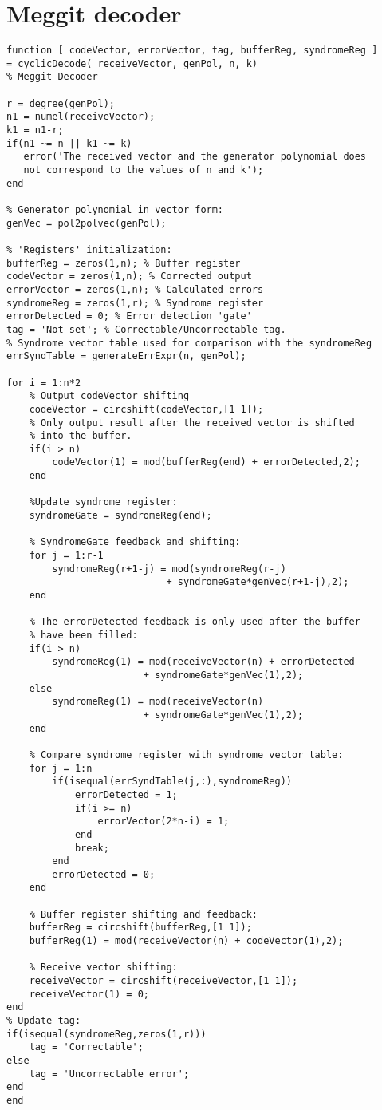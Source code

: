 \documentclass[MiniProjectMain]{subfiles}
\begin{document}
\newpage
\section{Meggit decoder}

\begin{lstlisting}[caption=Cyclic Meggit decoding]
function [ codeVector, errorVector, tag, bufferReg, syndromeReg ] 
= cyclicDecode( receiveVector, genPol, n, k)
% Meggit Decoder

r = degree(genPol);
n1 = numel(receiveVector);
k1 = n1-r;
if(n1 ~= n || k1 ~= k)
   error('The received vector and the generator polynomial does 
   not correspond to the values of n and k'); 
end

% Generator polynomial in vector form:
genVec = pol2polvec(genPol);

% 'Registers' initialization:
bufferReg = zeros(1,n); % Buffer register
codeVector = zeros(1,n); % Corrected output
errorVector = zeros(1,n); % Calculated errors
syndromeReg = zeros(1,r); % Syndrome register
errorDetected = 0; % Error detection 'gate'
tag = 'Not set'; % Correctable/Uncorrectable tag.
% Syndrome vector table used for comparison with the syndromeReg
errSyndTable = generateErrExpr(n, genPol);

for i = 1:n*2
    % Output codeVector shifting
    codeVector = circshift(codeVector,[1 1]);
    % Only output result after the received vector is shifted 
   	% into the buffer.
    if(i > n)
        codeVector(1) = mod(bufferReg(end) + errorDetected,2);
    end

    %Update syndrome register:
    syndromeGate = syndromeReg(end);

    % SyndromeGate feedback and shifting:
    for j = 1:r-1
        syndromeReg(r+1-j) = mod(syndromeReg(r-j) 
        					+ syndromeGate*genVec(r+1-j),2);
    end
    
    % The errorDetected feedback is only used after the buffer 
    % have been filled:
    if(i > n)
        syndromeReg(1) = mod(receiveVector(n) + errorDetected 
        				+ syndromeGate*genVec(1),2);
    else
        syndromeReg(1) = mod(receiveVector(n) 
        				+ syndromeGate*genVec(1),2);
    end
    
    % Compare syndrome register with syndrome vector table:
    for j = 1:n
        if(isequal(errSyndTable(j,:),syndromeReg))
            errorDetected = 1;
            if(i >= n)
                errorVector(2*n-i) = 1;
            end
            break;
        end
        errorDetected = 0;
    end

    % Buffer register shifting and feedback:
    bufferReg = circshift(bufferReg,[1 1]);
    bufferReg(1) = mod(receiveVector(n) + codeVector(1),2);
    
    % Receive vector shifting:
    receiveVector = circshift(receiveVector,[1 1]);
    receiveVector(1) = 0;
end
% Update tag:
if(isequal(syndromeReg,zeros(1,r)))
    tag = 'Correctable';
else
    tag = 'Uncorrectable error';
end
end
\end{lstlisting}
\end{document}
